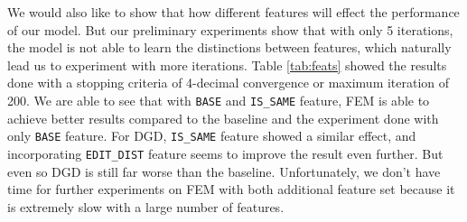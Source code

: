 \documentclass[11pt,letterpaper]{article}
\begin{document}
\begin{table}[h]
\centering
{}
\caption{\label{tab:time} Time of the algorithms with 5 iterations 1768 sentences and tested on 200, only with base features}
\end{table}

We would also like to show that how different features will effect the performance of our model.
But our preliminary experiments show that with only 5 iterations, the model is not able to learn the distinctions between features, which naturally lead us to experiment with more iterations.
Table \ref{tab:feats} showed the results done with a stopping criteria of 4-decimal convergence or maximum iteration of 200.
We are able to see that with \texttt{BASE} and \texttt{IS\_SAME} feature, FEM is able to achieve better results compared to the baseline and the experiment done with only \texttt{BASE} feature.
For DGD, \texttt{IS\_SAME} feature showed a similar effect, and incorporating \texttt{EDIT\_DIST} feature seems to improve the result even further. But even so DGD is still far worse than the baseline.
Unfortunately, we don't have time for further experiments on FEM with both additional feature set because it is extremely slow with a large number of features.
\end{document}
